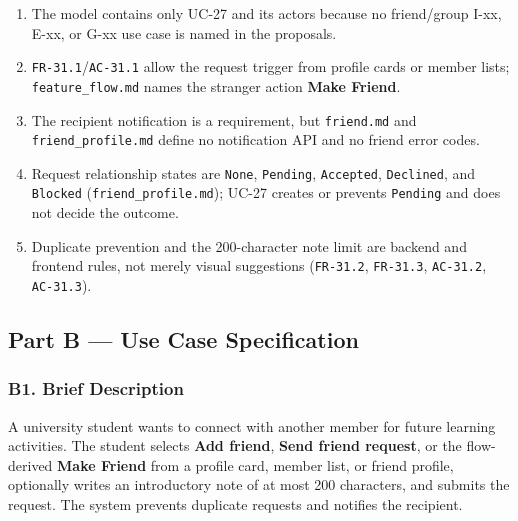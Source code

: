 \documentclass[12pt]{article}
\begin{document}
\begin{enumerate}
\item The model contains only UC-27 and its actors because no friend/group I-xx, E-xx, or G-xx use case is named in the proposals.
\item \texttt{FR-31.1}/\texttt{AC-31.1} allow the request trigger from profile cards or member lists; \texttt{feature\_flow.md} names the stranger action \textbf{Make Friend}.
\item The recipient notification is a requirement, but \texttt{friend.md} and \texttt{friend\_profile.md} define no notification API and no friend error codes.
\item Request relationship states are \texttt{None}, \texttt{Pending}, \texttt{Accepted}, \texttt{Declined}, and \texttt{Blocked} (\texttt{friend\_profile.md}); UC-27 creates or prevents \texttt{Pending} and does not decide the outcome.
\item Duplicate prevention and the 200-character note limit are backend and frontend rules, not merely visual suggestions (\texttt{FR-31.2}, \texttt{FR-31.3}, \texttt{AC-31.2}, \texttt{AC-31.3}).
\end{enumerate}
\par\medskip

\hypertarget{sec:part-b-use-case-specification}{}
\subsection*{Part B --- Use Case Specification}
\par\medskip

\hypertarget{sec:b1-brief-description}{}
\subsubsection*{B1. Brief Description}
\par\medskip

A university student wants to connect with another member for future learning activities. The student selects \textbf{Add friend}, \textbf{Send friend request}, or the flow-derived \textbf{Make Friend} from a profile card, member list, or friend profile, optionally writes an introductory note of at most 200 characters, and submits the request. The system prevents duplicate requests and notifies the recipient.
\par\medskip
\end{document}
